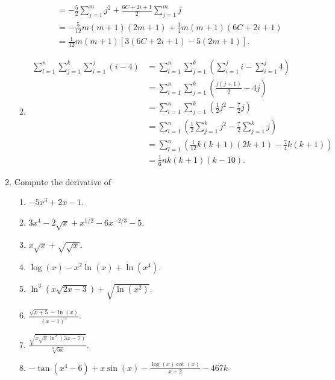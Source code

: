 \documentclass[9pt]{article}
\newcommand{\D}{\displaystyle}
\begin{document}
\begin{enumerate}
\begin{enumerate}
\begin{align*}
                     &= -\frac{5}{2}\sum_{j=1}^mj^2 +
                        \frac{6C+2i+1}{2}\sum_{j=1}^mj \\
                     &= -\frac{5}{12}m(m+1)(2m+1) + \frac{1}{4}m(m+1)(6C+2i+1)\\
                     &= \frac{1}{12} m(m+1)[3(6C + 2i + 1)-5(2m+1)].
               \end{align*}
         \item \begin{align*}
                  \sum_{l=1}^n\sum_{j=1}^k\sum_{i=1}^j (i - 4) &=
                     \sum_{l=1}^n\sum_{j=1}^k\left(\sum_{i=1}^ji -
                     \sum_{i=1}^j4\right) \\
                     &= \sum_{l=1}^n\sum_{j=1}^k\left(\frac{j(j+1)}{2} -
                        4j\right) \\
                     &= \sum_{l=1}^n\sum_{j=1}^k\left(\frac{1}{2}j^2 -
                           \frac{7}{2}j\right) \\
                     &= \sum_{l=1}^n\left(\frac{1}{2}\sum_{j=1}^kj^2 -
                           \frac{7}{2}\sum_{j=1}^kj\right) \\
                     &= \sum_{l=1}^n\left(\frac{1}{12}k(k+1)(2k+1) -
                           \frac{7}{4}k(k+1)\right) \\
                     &= \frac{1}{6} nk(k+1)(k-10).
               \end{align*}
      \end{enumerate}
   \item Compute the derivative of

         \begin{enumerate}
            \item $-5x^3 + 2x - 1$.
            \item $3x^4 - 2\sqrt{x} + x^{1/2} - 6x^{-2/3} - 5$.
            \item $x\sqrt{x} + \sqrt{\sqrt{x}}$.
            \item $\log(x) - x^2\ln(x) + \ln(x^4)$.
            \item $\ln^3(x\sqrt{2x - 3}) + \sqrt{\ln(x^2)}$.
            \item $\D\frac{\sqrt{x+5} - \ln(x)}{(x - 1)^3}$.
            \item $\D\frac{\sqrt{x\sqrt{x}\ln^2(3x - 7)}}{\sqrt[8]{5x}}$.
            \item $-\tan(x^4 - 6) + x\sin(x) -
                    \D\frac{\log(x)\cot(x)}{x+2} - 467k$.
         \end{enumerate}
      

\end{enumerate}
\end{document}
